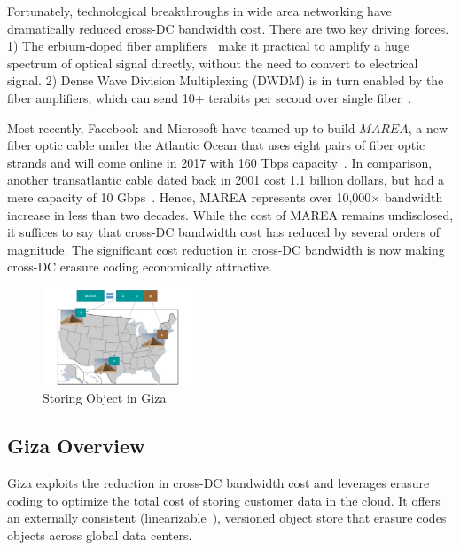 Fortunately, technological breakthroughs in wide area networking have dramatically reduced cross-DC bandwidth cost.
There are two key driving forces. 1) The erbium-doped fiber
amplifiers~\cite{mears1986low} make it practical to amplify a huge spectrum of
optical signal directly, without the need to convert to electrical signal.
2) Dense Wave Division Multiplexing (DWDM) is in turn enabled by the fiber
amplifiers, which can send 10+ terabits per second over single fiber~\cite{zhu2011112}.

Most recently, Facebook and Microsoft have teamed up to build $MAREA$, a new
fiber optic cable under the Atlantic Ocean that uses eight pairs of fiber optic
strands and will come online in 2017 with 160 Tbps capacity~\cite{bib:MAREA1, bib:MAREA2}.
In comparison, another transatlantic cable dated back in 2001 cost 1.1 billion dollars,
but had a mere capacity of 10 Gbps~\cite{bib:FA-1}.
Hence, MAREA represents over 10,000$\times$ bandwidth increase in less than two decades.
While the cost of MAREA remains undisclosed, it suffices
to say that cross-DC bandwidth cost has reduced by several orders of magnitude.
The significant cost reduction in cross-DC bandwidth is now
making cross-DC erasure coding economically attractive.


\begin{figure}[tp]
\centering
\includegraphics[width=0.4\textwidth]{images/giza_example_crop_fit}
\caption{Storing Object in Giza}
\label{fig:giza_example}
\end{figure}

\subsection{Giza Overview}

Giza exploits the reduction in cross-DC bandwidth cost
and leverages erasure coding to optimize the total cost of storing customer data in the cloud.
It offers an externally consistent (linearizable~\cite{herlihy90linearizability}),
versioned object store that erasure codes objects across global data centers.

